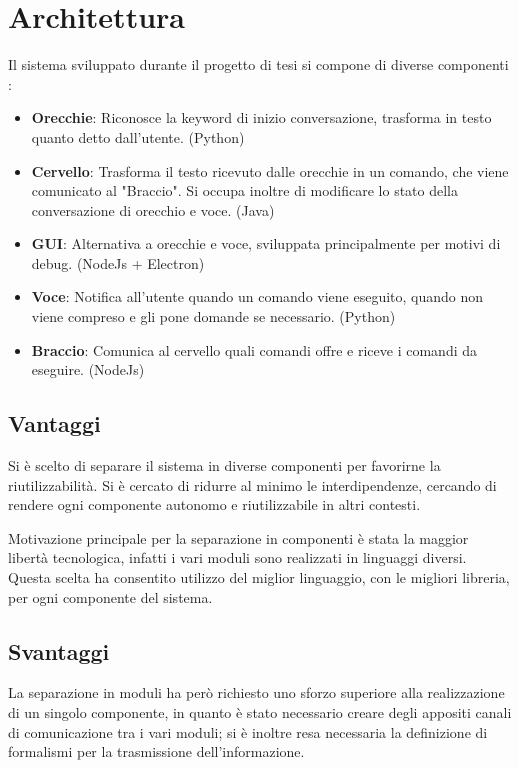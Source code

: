 \documentclass[twoside]{supsistudent}
\begin{document}
\chapter{Architettura}

Il sistema sviluppato durante il progetto di tesi si compone di diverse componenti :
\begin{itemize}
	\item \textbf{Orecchie}: Riconosce la keyword di inizio conversazione, trasforma in testo quanto detto dall'utente. (Python)
	\item \textbf{Cervello}: Trasforma il testo ricevuto dalle orecchie in un comando, che viene comunicato al "Braccio". Si occupa inoltre di modificare lo stato della conversazione di orecchio e voce. (Java)
	\item \textbf{GUI}: Alternativa a orecchie e voce, sviluppata principalmente per motivi di debug. (NodeJs + Electron)
	\item \textbf{Voce}: Notifica all'utente quando un comando viene eseguito, quando non viene compreso e gli pone domande se necessario. (Python)
	\item \textbf{Braccio}: Comunica al cervello quali comandi offre e riceve i comandi da eseguire. (NodeJs)
\end{itemize}
\section{Vantaggi}
Si è scelto di separare il sistema in diverse componenti per favorirne la riutilizzabilità. Si è cercato di ridurre al minimo le interdipendenze, cercando di rendere ogni componente autonomo e riutilizzabile in altri contesti.

Motivazione principale per la separazione in componenti è stata la maggior libertà tecnologica, infatti i vari moduli sono realizzati in linguaggi diversi. 
Questa scelta ha consentito utilizzo del miglior linguaggio, con le migliori libreria, per ogni componente del sistema.

\section{Svantaggi}

La separazione in moduli ha però richiesto uno sforzo superiore alla realizzazione di un singolo componente, in quanto è stato necessario creare degli appositi canali di comunicazione tra i vari moduli; si è inoltre resa necessaria la definizione di formalismi per la trasmissione dell'informazione.
\end{document}
